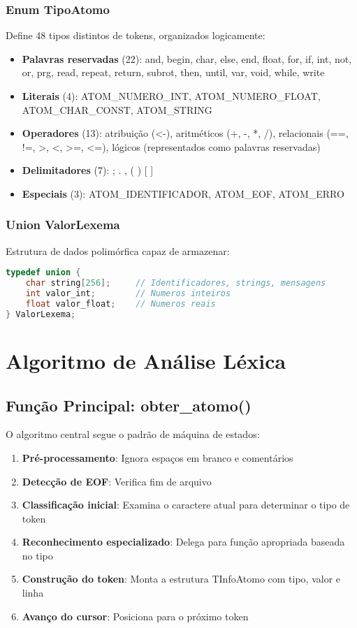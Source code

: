 \documentclass[12pt]{article}
\begin{document}
\subsubsection{Enum TipoAtomo}
Define 48 tipos distintos de tokens, organizados logicamente:
\begin{itemize}[noitemsep]
    \item \textbf{Palavras reservadas} (22): and, begin, char, else, end, float, for, if, int, not, or, prg, read, repeat, return, subrot, then, until, var, void, while, write
    \item \textbf{Literais} (4): ATOM\_NUMERO\_INT, ATOM\_NUMERO\_FLOAT, ATOM\_CHAR\_CONST, ATOM\_STRING
    \item \textbf{Operadores} (13): atribuição (<-), aritméticos (+, -, *, /), relacionais (==, !=, >, <, >=, <=), lógicos (representados como palavras reservadas)
    \item \textbf{Delimitadores} (7): ; . , ( ) [ ]
    \item \textbf{Especiais} (3): ATOM\_IDENTIFICADOR, ATOM\_EOF, ATOM\_ERRO
\end{itemize}

\subsubsection{Union ValorLexema}
Estrutura de dados polimórfica capaz de armazenar:
\begin{lstlisting}[language=C]
typedef union {
    char string[256];     // Identificadores, strings, mensagens
    int valor_int;        // Numeros inteiros
    float valor_float;    // Numeros reais
} ValorLexema;
\end{lstlisting}

\section{Algoritmo de Análise Léxica}

\subsection{Função Principal: obter\_atomo()}
O algoritmo central segue o padrão de máquina de estados:

\begin{enumerate}
    \item \textbf{Pré-processamento}: Ignora espaços em branco e comentários
    \item \textbf{Detecção de EOF}: Verifica fim de arquivo
    \item \textbf{Classificação inicial}: Examina o caractere atual para determinar o tipo de token
    \item \textbf{Reconhecimento especializado}: Delega para função apropriada baseada no tipo
    \item \textbf{Construção do token}: Monta a estrutura TInfoAtomo com tipo, valor e linha
    \item \textbf{Avanço do cursor}: Posiciona para o próximo token
\end{enumerate}
\end{document}
